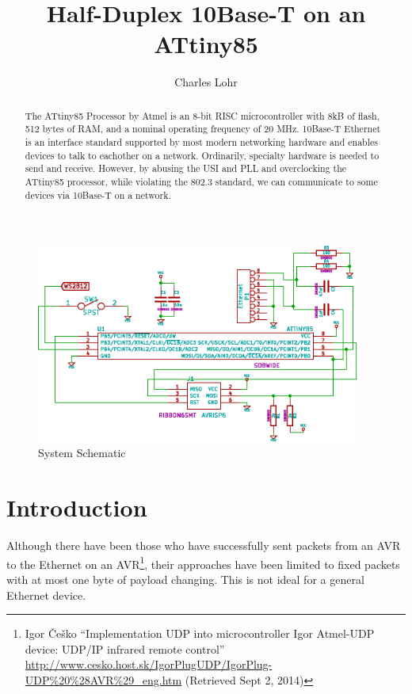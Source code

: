 \documentclass[13pt]{ltxdoc}
\begin{document}
\title{Half-Duplex 10Base-T on an ATtiny85}
\author{Charles Lohr}
\maketitle



\begin{abstract}
The ATtiny85 Processor by Atmel is an 8-bit RISC microcontroller with 8kB of 
flash, 512 bytes of RAM, and a nominal operating frequency of 20 MHz.
10Base-T Ethernet is an interface standard supported by most modern networking
hardware and enables devices to talk to eachother on a network.  Ordinarily,
specialty hardware is needed to send and receive.  However, by abusing
the USI and PLL and overclocking the ATtiny85 processor, while violating the 802.3 standard, we can communicate to some devices via 10Base-T on a network.
\end{abstract}

\begin{figure}[ht]
    \centering
    \includegraphics[width=4.2in]{schematic}
    \caption{System Schematic}
	\label{fig:schematic}
\end{figure}

\pagebreak
\section{Introduction}

Although there have been those who have successfully sent packets from an AVR to
the Ethernet on an AVR\footnote{Igor \v{C}e\v{s}ko ``Implementation UDP into microcontroller Igor Atmel-UDP device: UDP/IP infrared remote control'' \url{http://www.cesko.host.sk/IgorPlugUDP/IgorPlug-UDP\%20\%28AVR\%29_eng.htm} (Retrieved Sept 2, 2014)}, their approaches have been limited
to fixed packets with at most one byte of payload changing.  This is not ideal
for a general Ethernet device.
\end{document}
